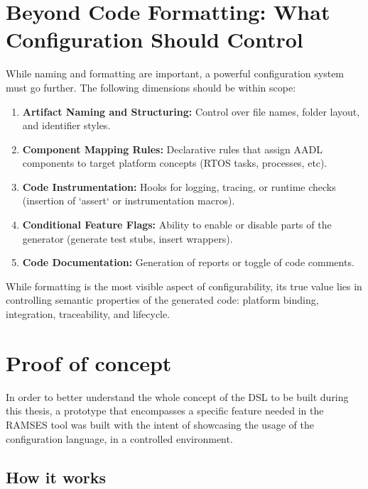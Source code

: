 \section{Beyond Code Formatting: What Configuration Should Control}
\label{sec:config_scope}

While naming and formatting are important, a powerful configuration system must go further. The following dimensions should be within scope:

\begin{enumerate}
	\item \textbf{Artifact Naming and Structuring:} Control over file names, folder layout, and identifier styles.
	\item \textbf{Component Mapping Rules:} Declarative rules that assign AADL components to target platform concepts (RTOS tasks, processes, etc).
	\item \textbf{Code Instrumentation:} Hooks for logging, tracing, or runtime checks (insertion of `assert` or instrumentation macros).
	\item \textbf{Conditional Feature Flags:} Ability to enable or disable parts of the generator (generate test stubs, insert wrappers).
	\item \textbf{Code Documentation:} Generation of reports or toggle of code comments.
\end{enumerate}

\begin{tcolorbox}[colback=blue!5, colframe=blue!50!black, title=Configuration is More Than Style]
	While formatting is the most visible aspect of configurability, its true value lies in controlling semantic properties of the generated code: platform binding, integration, traceability, and lifecycle.
\end{tcolorbox}

\section{Proof of concept}
\label{sec:proof_of_concept}

In order to better understand the whole concept of the \gls{DSL} to be built during this thesis, a prototype that encompasses a specific feature needed in the \gls{RAMSES} tool was built with the intent of showcasing the usage of the configuration language, in a controlled environment.

\subsection{How it works}
\label{sec:how_it_works}

